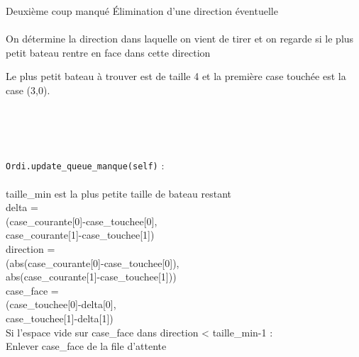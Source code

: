 \begin{frame}{Deuxième coup manqué}
Élimination d'une direction éventuelle\\~\\ \pause
On détermine la direction dans laquelle on vient de tirer et on regarde si le plus petit bateau rentre en face dans cette direction
\end{frame}

\begin{frame}
Le plus petit bateau à trouver est de taille 4 et la première case touchée est la case (3,0). \\~\\
\begin{center}

\\~\\
\end{center}
\end{frame}

{
\begin{frame}[allowframebreaks]
\texttt{Ordi.update\_queue\_manque(self)} :\\~\\

taille\_min est la plus petite taille de bateau restant\\
delta = \\
(case\_courante[0]-case\_touchee[0],\\
 case\_courante[1]-case\_touchee[1])\\
direction = \\
(abs(case\_courante[0]-case\_touchee[0]),\\
 abs(case\_courante[1]-case\_touchee[1]))\\
case\_face = \\
(case\_touchee[0]-delta[0],\\
 case\_touchee[1]-delta[1])\\
Si l'espace vide sur case\_face dans direction < taille\_min-1 :\\
Enlever case\_face de la file d'attente\\
\end{frame}
}

